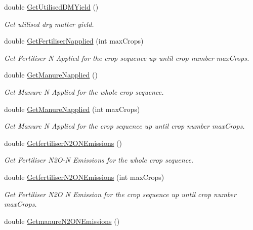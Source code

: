 \begin{DoxyCompactItemize}
double \mbox{\hyperlink{class_crop_sequence_class_a837331c0bae96fccef99bc094943c818}{Get\+Utilised\+D\+M\+Yield}} ()
\begin{DoxyCompactList}\small\item\em Get utilised dry matter yield. \end{DoxyCompactList}\item 
double \mbox{\hyperlink{class_crop_sequence_class_addf101545276712d2d93c28e298d36ae}{Get\+Fertiliser\+Napplied}} (int max\+Crops)
\begin{DoxyCompactList}\small\item\em Get Fertiliser N Applied for the crop sequence up until crop number max\+Crops. \end{DoxyCompactList}\item 
double \mbox{\hyperlink{class_crop_sequence_class_a1924ad8fa6a78b9e34d23251a32f2f62}{Get\+Manure\+Napplied}} ()
\begin{DoxyCompactList}\small\item\em Get Manure N Applied for the whole crop sequence. \end{DoxyCompactList}\item 
double \mbox{\hyperlink{class_crop_sequence_class_ab8a9ab2dcf60987421ec6d1dcc69be30}{Get\+Manure\+Napplied}} (int max\+Crops)
\begin{DoxyCompactList}\small\item\em Get Manure N Applied for the crop sequence up until crop number max\+Crops. \end{DoxyCompactList}\item 
double \mbox{\hyperlink{class_crop_sequence_class_af23bd7ffab590aadee2496ef4b3ecce0}{Getfertiliser\+N2\+O\+N\+Emissions}} ()
\begin{DoxyCompactList}\small\item\em Get Fertiliser N2\+O-\/N Emissions for the whole crop sequence. \end{DoxyCompactList}\item 
double \mbox{\hyperlink{class_crop_sequence_class_a25ec8b736a7caa75da1edcac08360cd7}{Getfertiliser\+N2\+O\+N\+Emissions}} (int max\+Crops)
\begin{DoxyCompactList}\small\item\em Get Fertiliser N2O N Emission for the crop sequence up until crop number max\+Crops. \end{DoxyCompactList}\item 
double \mbox{\hyperlink{class_crop_sequence_class_a16586cb2650f4022d7845851eb8a7543}{Getmanure\+N2\+O\+N\+Emissions}} ()

\end{DoxyCompactItemize}

